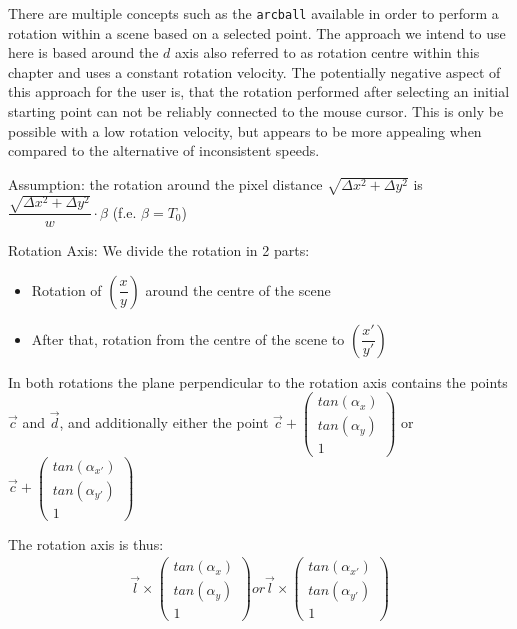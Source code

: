 \centerline{} \par  



There are multiple concepts such as the \verb|arcball| available in order to perform a rotation within a scene based on a selected point. The approach we intend to use here is based around the $d$ axis also referred to as rotation centre within this chapter and uses a constant rotation velocity.
The potentially negative aspect of this approach for the user is, that the rotation performed after selecting an initial starting point can not be reliably connected to the mouse cursor. This is only be possible with a low rotation velocity, but appears to be more appealing when compared to the alternative of inconsistent speeds.

Assumption: the rotation around the pixel distance $\sqrt{\Delta x^{2} + \Delta y^{2}}$ is $\dfrac{\sqrt{\Delta x^{2} + \Delta y^{2}}}{w} \cdot \beta $ (f.e. $\beta = T_{0} $)

Rotation Axis: We divide the rotation in 2 parts:
\begin{itemize}
	\item[] Rotation of $\left(\dfrac{x}{y}\right)$ around the centre of the scene
	\item[] After that, rotation from the centre of the scene to $ \left(\dfrac{x'}{y'} \right)$
\end{itemize}

In both rotations the plane perpendicular to the rotation axis contains the points $\overrightarrow{c}$ and $\overrightarrow{d}$, and additionally either the point $ \overrightarrow{c} + \left(\begin{smallmatrix}tan (\alpha_{x}) \\ tan (\alpha_{y}) \\ 1\end{smallmatrix}\right) $ or $ \overrightarrow{c} + \left(\begin{smallmatrix}tan (\alpha_{x'}) \\ tan (\alpha_{y'}) \\ 1\end{smallmatrix}\right) $

The rotation axis is thus:
\begin{align*}
	& \overrightarrow{l} \times \left(\begin{smallmatrix}tan (\alpha_{x}) \\ tan (\alpha_{y}) \\ 1\end{smallmatrix}\right)  or   \overrightarrow{l} \times \left(\begin{smallmatrix}tan (\alpha_{x'}) \\ tan (\alpha_{y'}) \\ 1\end{smallmatrix}\right)  &  
\end{align*}

